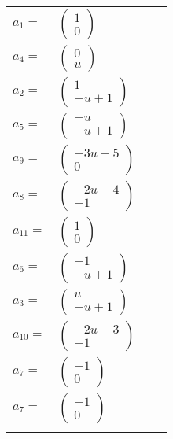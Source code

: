 \documentclass[1p]{elsarticle_modified}
\theoremstyle{definition}
\begin{document}
\begin{tabular}{m{7pt} m{180pt} m{7pt} m{180pt} }
\flushright $a_{1}=$&$\begin{pmatrix}1\\0\end{pmatrix}$ \\
\flushright $a_{4}=$&$\begin{pmatrix}0\\u\end{pmatrix}$ \\
\flushright $a_{2}=$&$\begin{pmatrix}1\\- u+1\end{pmatrix}$ \\
\flushright $a_{5}=$&$\begin{pmatrix}- u\\- u+1\end{pmatrix}$ \\
\flushright $a_{9}=$&$\begin{pmatrix}-3 u-5\\0\end{pmatrix}$ \\
\flushright $a_{8}=$&$\begin{pmatrix}-2 u-4\\-1\end{pmatrix}$ \\
\flushright $a_{11}=$&$\begin{pmatrix}1\\0\end{pmatrix}$ \\
\flushright $a_{6}=$&$\begin{pmatrix}-1\\- u+1\end{pmatrix}$ \\
\flushright $a_{3}=$&$\begin{pmatrix}u\\- u+1\end{pmatrix}$ \\
\flushright $a_{10}=$&$\begin{pmatrix}-2 u-3\\-1\end{pmatrix}$ \\
\flushright $a_{7}=$&$\begin{pmatrix}-1\\0\end{pmatrix}$\\ \flushright $a_{7}=$&$\begin{pmatrix}-1\\0\end{pmatrix}$\\&\end{tabular}
\end{document}
